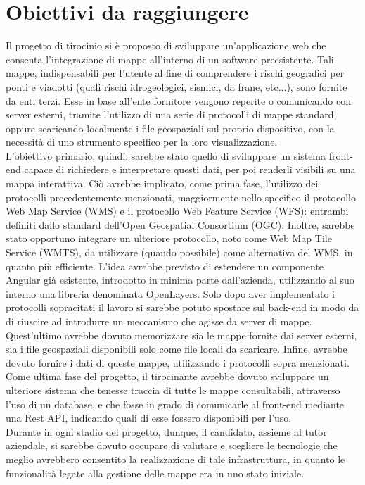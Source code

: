 \section*{Obiettivi da raggiungere}

Il progetto di tirocinio si è proposto di sviluppare un'applicazione web che consenta l'integrazione di mappe all'interno di un software preesistente. Tali mappe, indispensabili per l'utente al fine di comprendere i rischi geografici per ponti e viadotti (quali rischi idrogeologici, sismici, da frane, etc...), sono fornite da enti terzi. Esse in base all'ente fornitore vengono reperite o comunicando con server esterni, tramite l'utilizzo di una serie di protocolli di mappe standard, oppure scaricando localmente i file geospaziali sul proprio dispositivo, con la necessità di uno strumento specifico per la loro visualizzazione. 
\\L’obiettivo primario, quindi, sarebbe stato quello di sviluppare un sistema front-end capace di richiedere e interpretare questi dati, per poi renderli visibili su una mappa interattiva. Ciò avrebbe implicato, come prima fase, l'utilizzo dei protocolli precedentemente menzionati, maggiormente nello specifico il protocollo Web Map Service (WMS) e il protocollo Web Feature Service (WFS): entrambi definiti dallo standard dell'Open Geospatial Consortium (OGC). Inoltre, sarebbe stato opportuno integrare un ulteriore protocollo, noto come Web Map Tile Service (WMTS), da utilizzare (quando possibile) come alternativa del WMS, in quanto più efficiente. L'idea avrebbe previsto di estendere un componente Angular già esistente, introdotto in minima parte dall'azienda, utilizzando al suo interno una libreria denominata OpenLayers. Solo dopo aver implementato i protocolli sopracitati il lavoro si sarebbe potuto spostare sul back-end in modo da di riuscire ad introdurre un meccanismo che agisse da server di mappe. Quest'ultimo avrebbe dovuto memorizzare sia le mappe fornite dai server esterni, sia i file geospaziali disponibili solo come file locali da scaricare. Infine, avrebbe dovuto fornire i dati di queste mappe, utilizzando i protocolli sopra menzionati. Come ultima fase del progetto, il tirocinante avrebbe dovuto sviluppare un ulteriore sistema che tenesse traccia di tutte le mappe consultabili, attraverso l'uso di un database, e che fosse in grado di comunicarle al front-end mediante una Rest API, indicando quali di esse fossero disponibili per l'uso. 
\\Durante in ogni stadio del progetto, dunque, il candidato, assieme al tutor aziendale, si sarebbe dovuto occupare di valutare e scegliere le tecnologie che meglio avrebbero consentito la realizzazione di tale infrastruttura, in quanto le funzionalità legate alla gestione delle mappe era in uno stato iniziale.

